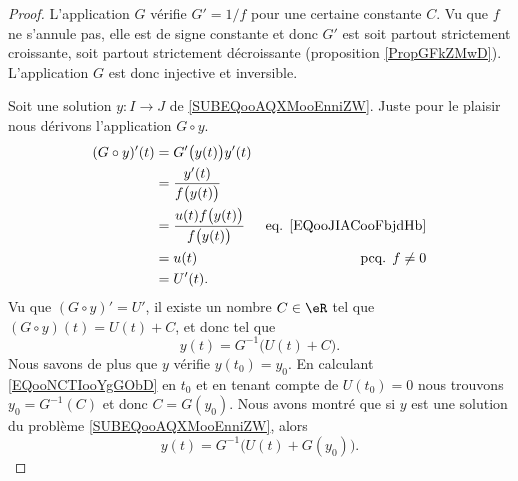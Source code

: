 \begin{proof}
	L'application \( G\) vérifie \( G'=1/f\) pour une certaine constante \( C\). Vu que \( f\) ne s'annule pas, elle est de signe constante et donc \( G'\) est soit partout strictement croissante, soit partout strictement décroissante (proposition \ref{PropGFkZMwD}). L'application \( G\) est donc injective et inversible.

	Soit une solution \(y \colon I\to J  \) de \eqref{SUBEQooAQXMooEnniZW}. Juste pour le plaisir nous dérivons l'application \( G\circ y\).
	\begin{subequations}
		\begin{align}
			(G\circ y)'(t) & =G'\big( y(t) \big)y'(t)                                                                   \\
			               & =\frac{ y'(t) }{ f\big( y(t) \big) }                                                       \\
			               & =\frac{ u(t)f\big( y(t) \big) }{ f\big( y(t) \big) } & \text{eq. \eqref{EQooJIACooFbjdHb}} \\
			               & = u(t)                                               & \text{pcq. }  f\neq 0               \\
			               & =U'(t).
		\end{align}
	\end{subequations}
	Vu que \( (G\circ y)'=U'\), il existe un nombre \( C\in \eR\) tel que \( (G\circ y)(t)=U(t)+C\), et donc tel que
	\begin{equation}		\label{EQooNCTIooYgGObD}
		y(t)=G^{-1}\big( U(t)+C \big).
	\end{equation}
	Nous savons de plus que \( y\) vérifie \( y(t_0)=y_0\). En calculant \eqref{EQooNCTIooYgGObD} en \( t_0\) et en tenant compte de \( U(t_0)=0\) nous trouvons \( y_0=G^{-1}(C)\) et donc \( C=G(y_0)\). Nous avons montré que si \( y\) est une solution du problème \eqref{SUBEQooAQXMooEnniZW}, alors
	\begin{equation}
		y(t)=G^{-1}\big( U(t)+G(y_0) \big).
	\end{equation}
\end{proof}


